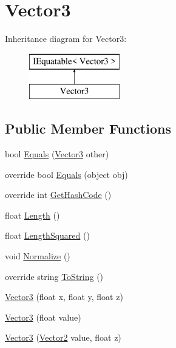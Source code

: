 \hypertarget{structMicrosoft_1_1Xna_1_1Framework_1_1Vector3}{}\section{Vector3}
\label{structMicrosoft_1_1Xna_1_1Framework_1_1Vector3}
Inheritance diagram for Vector3\+:\begin{figure}[H]
\begin{center}
\leavevmode
\includegraphics[height=2.000000cm]{structMicrosoft_1_1Xna_1_1Framework_1_1Vector3}
\end{center}
\end{figure}
\subsection*{Public Member Functions}
\begin{DoxyCompactItemize}
\item 
bool \hyperlink{structMicrosoft_1_1Xna_1_1Framework_1_1Vector3_ab26156effb971796cd94b0b9a04c5510}{Equals} (\hyperlink{structMicrosoft_1_1Xna_1_1Framework_1_1Vector3}{Vector3} other)
\item 
override bool \hyperlink{structMicrosoft_1_1Xna_1_1Framework_1_1Vector3_aadf763f0213fc2f3875230b06bb0b6cf}{Equals} (object obj)
\item 
override int \hyperlink{structMicrosoft_1_1Xna_1_1Framework_1_1Vector3_a77e1afa2b6dee1ed3640da81d7407b42}{Get\+Hash\+Code} ()
\item 
float \hyperlink{structMicrosoft_1_1Xna_1_1Framework_1_1Vector3_aad3844ad28d7ac4d504313c0037e11ac}{Length} ()
\item 
float \hyperlink{structMicrosoft_1_1Xna_1_1Framework_1_1Vector3_a69c72fec33d724953b523e6997682e9c}{Length\+Squared} ()
\item 
void \hyperlink{structMicrosoft_1_1Xna_1_1Framework_1_1Vector3_af279e0f0ff720ee54d6733674dfda50a}{Normalize} ()
\item 
override string \hyperlink{structMicrosoft_1_1Xna_1_1Framework_1_1Vector3_aa73e7c4dd1df5fd5fbf81c7764ee1533}{To\+String} ()
\item 
\hyperlink{structMicrosoft_1_1Xna_1_1Framework_1_1Vector3_a1bbdb6703f7802eefdcf70adc844ef96}{Vector3} (float x, float y, float z)
\item 
\hyperlink{structMicrosoft_1_1Xna_1_1Framework_1_1Vector3_a39f41b5ff10df48f221d04106804dcb5}{Vector3} (float value)
\item 
\hyperlink{structMicrosoft_1_1Xna_1_1Framework_1_1Vector3_aae7b6433e462c79f0968a5892ab829fd}{Vector3} (\hyperlink{structMicrosoft_1_1Xna_1_1Framework_1_1Vector2}{Vector2} value, float z)
\end{DoxyCompactItemize}
